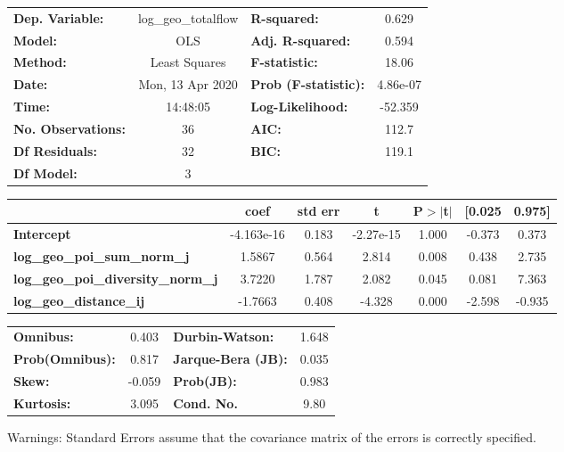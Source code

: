 \begin{center}
\begin{tabular}{lclc}
\toprule
\textbf{Dep. Variable:}                    & log\_geo\_totalflow & \textbf{  R-squared:         } &     0.629   \\
\textbf{Model:}                            &         OLS         & \textbf{  Adj. R-squared:    } &     0.594   \\
\textbf{Method:}                           &    Least Squares    & \textbf{  F-statistic:       } &     18.06   \\
\textbf{Date:}                             &   Mon, 13 Apr 2020  & \textbf{  Prob (F-statistic):} &  4.86e-07   \\
\textbf{Time:}                             &       14:48:05      & \textbf{  Log-Likelihood:    } &   -52.359   \\
\textbf{No. Observations:}                 &            36       & \textbf{  AIC:               } &     112.7   \\
\textbf{Df Residuals:}                     &            32       & \textbf{  BIC:               } &     119.1   \\
\textbf{Df Model:}                         &             3       & \textbf{                     } &             \\
\bottomrule
\end{tabular}
\begin{tabular}{lcccccc}
                                           & \textbf{coef} & \textbf{std err} & \textbf{t} & \textbf{P$> |$t$|$} & \textbf{[0.025} & \textbf{0.975]}  \\
\midrule
\textbf{Intercept}                         &   -4.163e-16  &        0.183     & -2.27e-15  &         1.000        &       -0.373    &        0.373     \\
\textbf{log\_geo\_poi\_sum\_norm\_j}       &       1.5867  &        0.564     &     2.814  &         0.008        &        0.438    &        2.735     \\
\textbf{log\_geo\_poi\_diversity\_norm\_j} &       3.7220  &        1.787     &     2.082  &         0.045        &        0.081    &        7.363     \\
\textbf{log\_geo\_distance\_ij}            &      -1.7663  &        0.408     &    -4.328  &         0.000        &       -2.598    &       -0.935     \\
\bottomrule
\end{tabular}
\begin{tabular}{lclc}
\textbf{Omnibus:}       &  0.403 & \textbf{  Durbin-Watson:     } &    1.648  \\
\textbf{Prob(Omnibus):} &  0.817 & \textbf{  Jarque-Bera (JB):  } &    0.035  \\
\textbf{Skew:}          & -0.059 & \textbf{  Prob(JB):          } &    0.983  \\
\textbf{Kurtosis:}      &  3.095 & \textbf{  Cond. No.          } &     9.80  \\
\bottomrule
\end{tabular}
\end{center}

Warnings: \newline
 [1] Standard Errors assume that the covariance matrix of the errors is correctly specified.